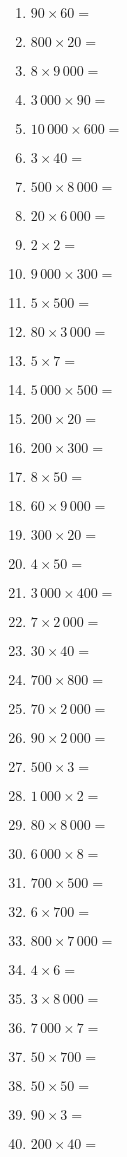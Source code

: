 \documentclass[11pt]{article}
\begin{document}
\begin{exercice}[2]
\begin{multicols}{4}
\begin{enumerate}[label=\arabic*)]
\item  $ 90 \times 60 =  $ 
\item  $ 800 \times 20 =  $ 
\item  $ 8 \times 9\,000 =  $ 
\item  $ 3\,000 \times 90 =  $ 
\item  $ 10\,000 \times 600 =  $ 
\item  $ 3 \times 40 =  $ 
\item  $ 500 \times 8\,000 =  $ 
\item  $ 20 \times 6\,000 =  $ 
\item  $ 2 \times 2 =  $ 
\item  $ 9\,000 \times 300 =  $ 
\item  $ 5 \times 500 =  $ 
\item  $ 80 \times 3\,000 =  $ 
\item  $ 5 \times 7 =  $ 
\item  $ 5\,000 \times 500 =  $ 
\item  $ 200 \times 20 =  $ 
\item  $ 200 \times 300 =  $ 
\item  $ 8 \times 50 =  $ 
\item  $ 60 \times 9\,000 =  $ 
\item  $ 300 \times 20 =  $ 
\item  $ 4 \times 50 =  $ 
\item  $ 3\,000 \times 400 =  $ 
\item  $ 7 \times 2\,000 =  $ 
\item  $ 30 \times 40 =  $ 
\item  $ 700 \times 800 =  $ 
\item  $ 70 \times 2\,000 =  $ 
\item  $ 90 \times 2\,000 =  $ 
\item  $ 500 \times 3 =  $ 
\item  $ 1\,000 \times 2 =  $ 
\item  $ 80 \times 8\,000 =  $ 
\item  $ 6\,000 \times 8 =  $ 
\item  $ 700 \times 500 =  $ 
\item  $ 6 \times 700 =  $ 
\item  $ 800 \times 7\,000 =  $ 
\item  $ 4 \times 6 =  $ 
\item  $ 3 \times 8\,000 =  $ 
\item  $ 7\,000 \times 7 =  $ 
\item  $ 50 \times 700 =  $ 
\item  $ 50 \times 50 =  $ 
\item  $ 90 \times 3 =  $ 
\item  $ 200 \times 40 =  $ 
\end{enumerate}
\end{multicols}
\end{exercice}
\end{document}
